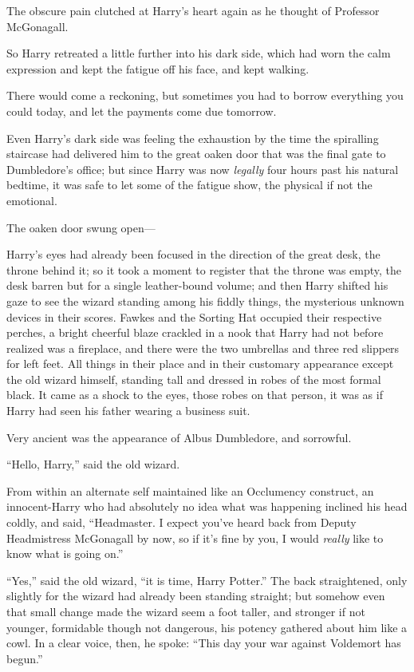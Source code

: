 The obscure pain clutched at Harry’s heart again as he thought of Professor McGonagall.

So Harry retreated a little further into his dark side, which had worn the calm expression and kept the fatigue off his face, and kept walking.

There would come a reckoning, but sometimes you had to borrow everything you could today, and let the payments come due tomorrow.

\later

Even Harry’s dark side was feeling the exhaustion by the time the spiralling staircase had delivered him to the great oaken door that was the final gate to Dumbledore’s office; but since Harry was now \emph{legally} four hours past his natural bedtime, it was safe to let some of the fatigue show, the physical if not the emotional.

The oaken door swung open—

Harry’s eyes had already been focused in the direction of the great desk, the throne behind it; so it took a moment to register that the throne was empty, the desk barren but for a single leather-bound volume; and then Harry shifted his gaze to see the wizard standing among his fiddly things, the mysterious unknown devices in their scores. Fawkes and the Sorting Hat occupied their respective perches, a bright cheerful blaze crackled in a nook that Harry had not before realized was a fireplace, and there were the two umbrellas and three red slippers for left feet. All things in their place and in their customary appearance except the old wizard himself, standing tall and dressed in robes of the most formal black. It came as a shock to the eyes, those robes on that person, it was as if Harry had seen his father wearing a business suit.

Very ancient was the appearance of Albus Dumbledore, and sorrowful.

“Hello, Harry,” said the old wizard.

From within an alternate self maintained like an Occlumency construct, an innocent-Harry who had absolutely no idea what was happening inclined his head coldly, and said, “Headmaster. I expect you’ve heard back from Deputy Headmistress McGonagall by now, so if it’s fine by you, I would \emph{really} like to know what is going on.”

“Yes,” said the old wizard, “it is time, Harry Potter.” The back straightened, only slightly for the wizard had already been standing straight; but somehow even that small change made the wizard seem a foot taller, and stronger if not younger, formidable though not dangerous, his potency gathered about him like a cowl. In a clear voice, then, he spoke: “This day your war against Voldemort has begun.”

